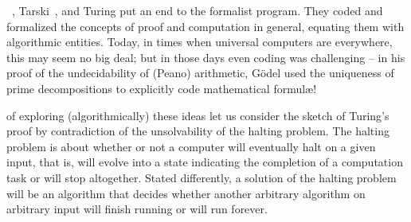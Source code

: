 ~\cite{godel1}, Tarski~\cite{tarski:32}, and Turing
\cite{turing-36} put an end to the formalist program.
They coded and  formalized the concepts of proof and computation in general,
equating them with algorithmic entities.
Today, in times when universal computers are everywhere, this may seem no big deal;
but in those days even coding was challenging -- in his proof
of the undecidability of (Peano) arithmetic,
G\"odel used the uniqueness of prime decompositions to explicitly code mathematical formul\ae!

 of exploring (algorithmically) these ideas
let us consider the sketch of Turing's proof by contradiction
of the unsolvability of the halting problem.
The halting problem is about whether or not a computer will eventually halt on a given input,
that is, will evolve into a state indicating the completion of a computation task or will stop altogether.
Stated differently, a solution of the halting problem will be an algorithm that
decides whether another arbitrary algorithm on arbitrary input will finish running or will run forever.

